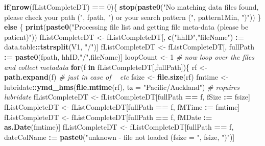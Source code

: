 \documentclass[]{article}
\newenvironment{Shaded}{\begin{snugshade}}{\end{snugshade}}
\newcommand{\KeywordTok}[1]{\textcolor[rgb]{0.13,0.29,0.53}{\textbf{#1}}}
\newcommand{\DataTypeTok}[1]{\textcolor[rgb]{0.13,0.29,0.53}{#1}}
\newcommand{\DecValTok}[1]{\textcolor[rgb]{0.00,0.00,0.81}{#1}}
\newcommand{\StringTok}[1]{\textcolor[rgb]{0.31,0.60,0.02}{#1}}
\newcommand{\CommentTok}[1]{\textcolor[rgb]{0.56,0.35,0.01}{\textit{#1}}}
\newcommand{\ControlFlowTok}[1]{\textcolor[rgb]{0.13,0.29,0.53}{\textbf{#1}}}
\newcommand{\OperatorTok}[1]{\textcolor[rgb]{0.81,0.36,0.00}{\textbf{#1}}}
\newcommand{\ErrorTok}[1]{\textcolor[rgb]{0.64,0.00,0.00}{\textbf{#1}}}
\newcommand{\NormalTok}[1]{#1}
\begin{document}
\begin{Shaded}
\begin{Highlighting}[]
\ControlFlowTok{if}\NormalTok{(}\KeywordTok{nrow}\NormalTok{(fListCompleteDT) }\OperatorTok{==}\StringTok{ }\DecValTok{0}\NormalTok{)\{}
  \KeywordTok{stop}\NormalTok{(}\KeywordTok{paste0}\NormalTok{(}\StringTok{"No matching data files found, please check your path ("}\NormalTok{, fpath, }\StringTok{") or your search pattern ("}\NormalTok{, pattern1Min, }\StringTok{")"}\NormalTok{))}
\NormalTok{\} }\ControlFlowTok{else}\NormalTok{ \{}
  \KeywordTok{print}\NormalTok{(}\KeywordTok{paste0}\NormalTok{(}\StringTok{"Processing file list and getting file meta-data (please be patient)"}\NormalTok{))}
\NormalTok{  fListCompleteDT <-}\StringTok{ }\NormalTok{fListCompleteDT[, }\KeywordTok{c}\NormalTok{(}\StringTok{"hhID"}\NormalTok{,}\StringTok{"fileName"}\NormalTok{) }\OperatorTok{:}\ErrorTok{=}\StringTok{ }\NormalTok{data.table}\OperatorTok{::}\KeywordTok{tstrsplit}\NormalTok{(V1, }\StringTok{"/"}\NormalTok{)]}
\NormalTok{  fListCompleteDT <-}\StringTok{ }\NormalTok{fListCompleteDT[, fullPath }\OperatorTok{:}\ErrorTok{=}\StringTok{ }\KeywordTok{paste0}\NormalTok{(fpath, hhID,}\StringTok{"/"}\NormalTok{,fileName)]}
\NormalTok{  loopCount <-}\StringTok{ }\DecValTok{1}
  \CommentTok{# now loop over the files and collect metadata}
  \ControlFlowTok{for}\NormalTok{(f }\ControlFlowTok{in}\NormalTok{ fListCompleteDT[,fullPath])\{}
\NormalTok{    rf <-}\StringTok{ }\KeywordTok{path.expand}\NormalTok{(f) }\CommentTok{# just in case of ~ etc}
\NormalTok{    fsize <-}\StringTok{ }\KeywordTok{file.size}\NormalTok{(rf)}
\NormalTok{    fmtime <-}\StringTok{ }\NormalTok{lubridate}\OperatorTok{::}\KeywordTok{ymd_hms}\NormalTok{(}\KeywordTok{file.mtime}\NormalTok{(rf), }\DataTypeTok{tz =} \StringTok{"Pacific/Auckland"}\NormalTok{) }\CommentTok{# requires lubridate}
\NormalTok{    fListCompleteDT <-}\StringTok{ }\NormalTok{fListCompleteDT[fullPath }\OperatorTok{==}\StringTok{ }\NormalTok{f, fSize }\OperatorTok{:}\ErrorTok{=}\StringTok{ }\NormalTok{fsize]}
\NormalTok{    fListCompleteDT <-}\StringTok{ }\NormalTok{fListCompleteDT[fullPath }\OperatorTok{==}\StringTok{ }\NormalTok{f, fMTime }\OperatorTok{:}\ErrorTok{=}\StringTok{ }\NormalTok{fmtime]}
\NormalTok{    fListCompleteDT <-}\StringTok{ }\NormalTok{fListCompleteDT[fullPath }\OperatorTok{==}\StringTok{ }\NormalTok{f, fMDate }\OperatorTok{:}\ErrorTok{=}\StringTok{ }\KeywordTok{as.Date}\NormalTok{(fmtime)]}
\NormalTok{    fListCompleteDT <-}\StringTok{ }\NormalTok{fListCompleteDT[fullPath }\OperatorTok{==}\StringTok{ }\NormalTok{f, dateColName }\OperatorTok{:}\ErrorTok{=}\StringTok{ }\KeywordTok{paste0}\NormalTok{(}\StringTok{"unknown - file not loaded (fsize = "}\NormalTok{, fsize, }\StringTok{")"}\NormalTok{)]}

\end{Highlighting}
\end{Shaded}
\end{document}
